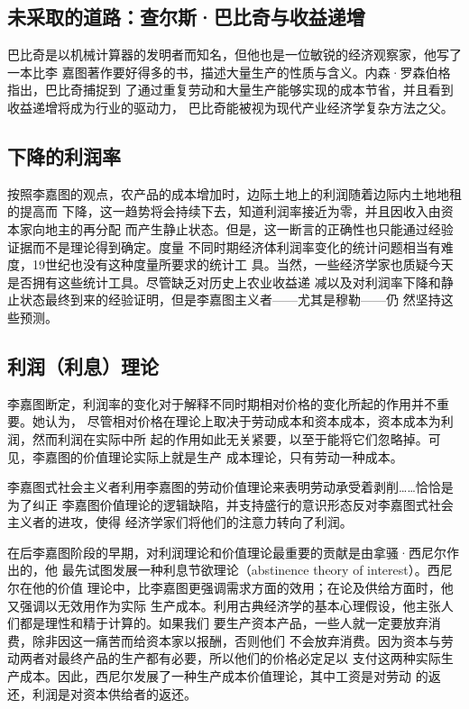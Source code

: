 \subsection{未采取的道路：查尔斯·巴比奇与收益递增}

巴比奇是以机械计算器的发明者而知名，但他也是一位敏锐的经济观察家，他写了一本比李
嘉图著作要好得多的书，描述大量生产的性质与含义。内森·罗森伯格指出，巴比奇捕捉到
了通过重复劳动和大量生产能够实现的成本节省，并且看到收益递增将成为行业的驱动力，
巴比奇能被视为现代产业经济学复杂方法之父。

\subsection{下降的利润率}

按照李嘉图的观点，农产品的成本增加时，边际土地上的利润随着边际内土地地租的提高而
下降，这一趋势将会持续下去，知道利润率接近为零，并且因收入由资本家向地主的再分配
而产生静止状态。但是，这一断言的正确性也只能通过经验证据而不是理论得到确定。度量
不同时期经济体利润率变化的统计问题相当有难度，19世纪也没有这种度量所要求的统计工
具。当然，一些经济学家也质疑今天是否拥有这些统计工具。尽管缺乏对历史上农业收益递
减以及对利润率下降和静止状态最终到来的经验证明，但是李嘉图主义者——尤其是穆勒——仍
然坚持这些预测。

\subsection{利润（利息）理论}

李嘉图断定，利润率的变化对于解释不同时期相对价格的变化所起的作用并不重要。她认为，
尽管相对价格在理论上取决于劳动成本和资本成本，资本成本为利润，然而利润在实际中所
起的作用如此无关紧要，以至于能将它们忽略掉。可见，李嘉图的价值理论实际上就是生产
成本理论，只有劳动一种成本。

李嘉图式社会主义者利用李嘉图的劳动价值理论来表明劳动承受着剥削……恰恰是为了纠正
李嘉图价值理论的逻辑缺陷，并支持盛行的意识形态反对李嘉图式社会主义者的进攻，使得
经济学家们将他们的注意力转向了利润。

在后李嘉图阶段的早期，对利润理论和价值理论最重要的贡献是由拿骚·西尼尔作出的，他
最先试图发展一种利息节欲理论（abstinence theory of interest）。西尼尔在他的价值
理论中，比李嘉图更强调需求方面的效用；在论及供给方面时，他又强调以无效用作为实际
生产成本。利用古典经济学的基本心理假设，他主张人们都是理性和精于计算的。如果我们
要生产资本产品，一些人就一定要放弃消费，除非因这一痛苦而给资本家以报酬，否则他们
不会放弃消费。因为资本与劳动两者对最终产品的生产都有必要，所以他们的价格必定足以
支付这两种实际生产成本。因此，西尼尔发展了一种生产成本价值理论，其中工资是对劳动
的返还，利润是对资本供给者的返还。


